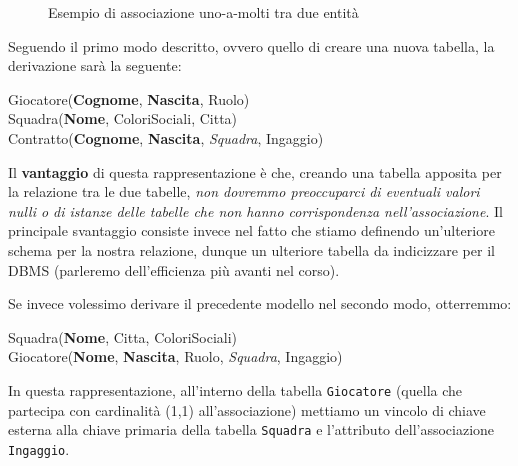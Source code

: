 \documentclass[12pt]{report}
\begin{document}
\begin{figure}[htbp]
{%
		}
		\caption{Esempio di associazione uno-a-molti tra due entità}
		\label{fig:relazione_contratto_giocatore_squadra}
	\end{figure}
	
	Seguendo il primo modo descritto, ovvero quello di creare una nuova tabella, la derivazione sarà la seguente:
	\begin{center}
		Giocatore(\textbf{Cognome}, \textbf{Nascita}, Ruolo)\\
		Squadra(\textbf{Nome}, ColoriSociali, Citta)\\
		Contratto(\textbf{Cognome}, \textbf{Nascita}, \textit{Squadra}, Ingaggio)
	\end{center}
	Il \textbf{vantaggio} di questa rappresentazione è che, creando una tabella apposita per la relazione tra le due tabelle, \textit{non dovremmo preoccuparci di eventuali valori nulli o di istanze delle tabelle che non hanno corrispondenza nell'associazione}.
	Il principale svantaggio consiste invece nel fatto che stiamo definendo un'ulteriore schema per la nostra relazione, dunque un ulteriore tabella da indicizzare per il DBMS (parleremo dell'efficienza più avanti nel corso).
	
	Se invece volessimo derivare il precedente modello nel secondo modo, otterremmo:
	\begin{center}
		Squadra(\textbf{Nome}, Citta, ColoriSociali)\\
		Giocatore(\textbf{Nome}, \textbf{Nascita}, Ruolo, \textit{Squadra}, Ingaggio)
	\end{center}
	In questa rappresentazione, all'interno della tabella \texttt{Giocatore} (quella che partecipa con cardinalità (1,1) all'associazione) mettiamo un vincolo di chiave esterna alla chiave primaria della tabella \texttt{Squadra} e l'attributo dell'associazione \texttt{Ingaggio}.
	
\end{document}
